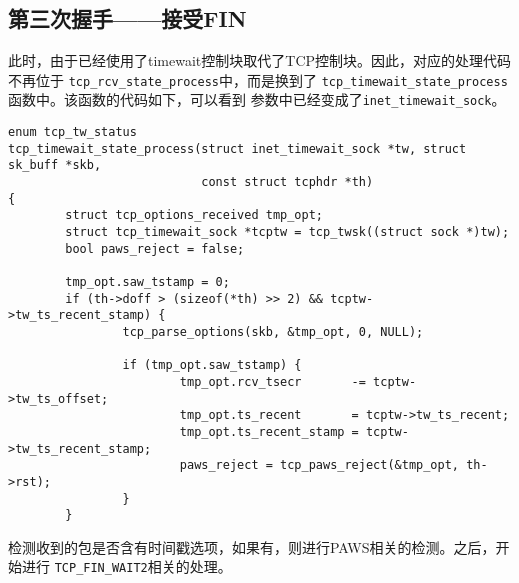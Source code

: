 \subsection{第三次握手——接受FIN}
\label{subsec:third_recv_fin}
此时，由于已经使用了timewait控制块取代了TCP控制块。因此，对应的处理代码不再位于
\texttt{tcp_rcv_state_process}中，而是换到了
\texttt{tcp_timewait_state_process}函数中。该函数的代码如下，可以看到
参数中已经变成了\texttt{inet_timewait_sock}。
\begin{verbatim}
enum tcp_tw_status
tcp_timewait_state_process(struct inet_timewait_sock *tw, struct sk_buff *skb,
                           const struct tcphdr *th)
{
        struct tcp_options_received tmp_opt;
        struct tcp_timewait_sock *tcptw = tcp_twsk((struct sock *)tw);
        bool paws_reject = false;

        tmp_opt.saw_tstamp = 0;
        if (th->doff > (sizeof(*th) >> 2) && tcptw->tw_ts_recent_stamp) {
                tcp_parse_options(skb, &tmp_opt, 0, NULL);

                if (tmp_opt.saw_tstamp) {
                        tmp_opt.rcv_tsecr       -= tcptw->tw_ts_offset;
                        tmp_opt.ts_recent       = tcptw->tw_ts_recent;
                        tmp_opt.ts_recent_stamp = tcptw->tw_ts_recent_stamp;
                        paws_reject = tcp_paws_reject(&tmp_opt, th->rst);
                }
        }
\end{verbatim}
检测收到的包是否含有时间戳选项，如果有，则进行PAWS相关的检测。之后，开始进行
\texttt{TCP_FIN_WAIT2}相关的处理。
